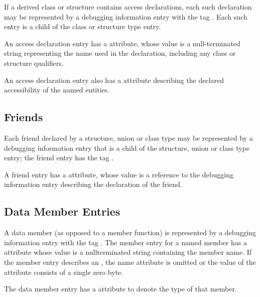 If a derived class or structure contains access declarations,
each such declaration may be represented by a debugging
information entry with the tag \DWTAGaccessdeclarationTARG.
Each such entry is a child of the class or structure type entry.

An access declaration entry has a \DWATname{} attribute,
whose value is a null-terminated string representing the name
used in the declaration,
including any class or structure qualifiers.

An\hypertarget{chap:DWATaccessdeclaration}{}
access declaration entry also has a
\hyperlink{chap:DWATaccessibilityattribute}{\DWATaccessibilityNAME}
attribute describing the declared accessibility of the named entities.


\subsection{Friends}
\label{chap:friends}

Each\hypertarget{chap:DWATfriendfriendrelationship}{}
friend
declared by a structure, union or class
type may be represented by a debugging information entry
that is a child of the structure, union or class type entry;
the friend entry has the tag \DWTAGfriendTARG.

A friend entry has a \DWATfriendDEFN{} attribute,
 whose value is
a reference to the debugging information entry describing
the declaration of the friend.


\subsection{Data Member Entries}
\label{chap:datamemberentries}

A data member (as opposed to a member function) is
represented by a debugging information entry with the
tag \DWTAGmemberTARG.
The
member entry for a named member has
a \DWATname{} attribute
whose value is a null\dash terminated
string containing the member name.
If the member entry describes an
,
the name attribute is omitted or the value of the attribute
consists of a single zero byte.

The data member entry has a
\DWATtype{} attribute to denote
 the type of that member.

